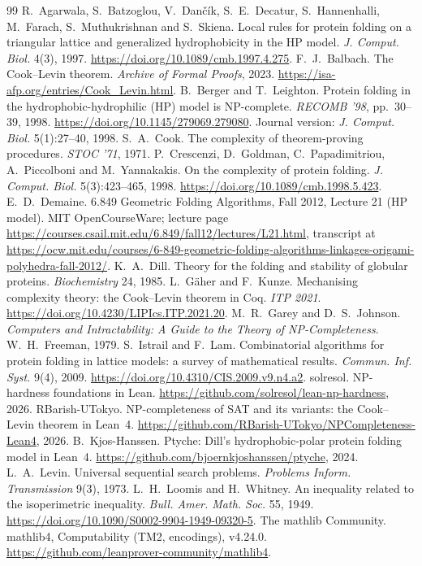 \documentclass[11pt,letterpaper]{article}
\theoremstyle{definition}
\theoremstyle{remark}
\begin{document}
\begin{thebibliography}{99}\small
{} R.~Agarwala, S.~Batzoglou, V.~Dan\v{c}\'ik, S.~E.~Decatur, S.~Hannenhalli,
  M.~Farach, S.~Muthukrishnan and S.~Skiena. Local rules for protein folding on a triangular lattice
  and generalized hydrophobicity in the HP model. \emph{J. Comput. Biol.} 4(3), 1997.
  \url{https://doi.org/10.1089/cmb.1997.4.275}.
 F.~J.~Balbach. The Cook--Levin theorem. \emph{Archive of Formal Proofs}, 2023.
  \url{https://isa-afp.org/entries/Cook_Levin.html}.
 B.~Berger and T.~Leighton. Protein folding in the hydrophobic-hydrophilic (HP) model
  is NP-complete. \emph{RECOMB '98}, pp.~30--39, 1998. \url{https://doi.org/10.1145/279069.279080}.
  Journal version: \emph{J. Comput. Biol.} 5(1):27--40, 1998.
 S.~A.~Cook. The complexity of theorem-proving procedures. \emph{STOC '71}, 1971.
 P.~Crescenzi, D.~Goldman, C.~Papadimitriou, A.~Piccolboni and M.~Yannakakis. On the
  complexity of protein folding. \emph{J. Comput. Biol.} 5(3):423--465, 1998.
  \url{https://doi.org/10.1089/cmb.1998.5.423}.
 E.~D.~Demaine. 6.849 Geometric Folding Algorithms, Fall 2012, Lecture 21 (HP
  model). MIT OpenCourseWare; lecture page
  \url{https://courses.csail.mit.edu/6.849/fall12/lectures/L21.html}, transcript at
  \url{https://ocw.mit.edu/courses/6-849-geometric-folding-algorithms-linkages-origami-polyhedra-fall-2012/}.
 K.~A.~Dill. Theory for the folding and stability of globular proteins.
  \emph{Biochemistry} 24, 1985.
 L.~G\"aher and F.~Kunze. Mechanising complexity theory: the Cook--Levin theorem in
  Coq. \emph{ITP 2021}. \url{https://doi.org/10.4230/LIPIcs.ITP.2021.20}.
 M.~R.~Garey and D.~S.~Johnson. \emph{Computers and Intractability: A Guide to the
  Theory of NP-Completeness}. W.~H.~Freeman, 1979.
 S.~Istrail and F.~Lam. Combinatorial algorithms for protein folding in lattice models:
  a survey of mathematical results. \emph{Commun. Inf. Syst.} 9(4), 2009.
  \url{https://doi.org/10.4310/CIS.2009.v9.n4.a2}.
 solresol. NP-hardness foundations in Lean.
  \url{https://github.com/solresol/lean-np-hardness}, 2026.
 RBarish-UTokyo. NP-completeness of SAT and its variants: the Cook--Levin theorem
  in Lean~4. \url{https://github.com/RBarish-UTokyo/NPCompleteness-Lean4}, 2026.
 B.~Kjos-Hanssen. Ptyche: Dill's hydrophobic-polar protein folding model in Lean~4.
  \url{https://github.com/bjoernkjoshanssen/ptyche}, 2024.
 L.~A.~Levin. Universal sequential search problems. \emph{Problems Inform.
  Transmission} 9(3), 1973.
 L.~H.~Loomis and H.~Whitney. An inequality related to the isoperimetric inequality.
  \emph{Bull. Amer. Math. Soc.} 55, 1949. \url{https://doi.org/10.1090/S0002-9904-1949-09320-5}.
 The mathlib Community. mathlib4, Computability (TM2, encodings), v4.24.0.
  \url{https://github.com/leanprover-community/mathlib4}.
\end{thebibliography}
\end{document}
